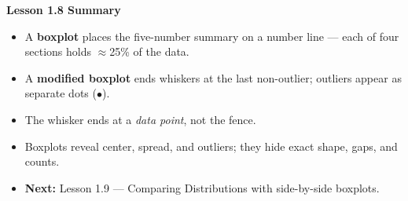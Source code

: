 \documentclass[aspectratio=169, 11pt]{beamer}
\begin{document}
{
\begin{frame}[plain]
  \vspace{1.5cm}
  \hspace{0.55cm}%
  \begin{minipage}{0.9\textwidth}
    {\color{goldacc}\bfseries\large Lesson 1.8 Summary}\\[0.8cm]
    \small
    \begin{itemize}\setlength{\itemsep}{0.5em}
      \item {\color{white} A \textbf{boxplot} places the five-number summary on a number
            line --- each of four sections holds $\approx$25\% of the data.}
      \item {\color{white} A \textbf{modified boxplot} ends whiskers at the last
            non-outlier; outliers appear as separate dots ($\bullet$).}
      \item {\color{white} The whisker ends at a \textit{data point}, not the fence.}
      \item {\color{white} Boxplots reveal center, spread, and outliers; they hide
            exact shape, gaps, and counts.}
      \item {\color{skymid} \textbf{Next:} Lesson 1.9 --- Comparing Distributions with
            side-by-side boxplots.}
    \end{itemize}
  \end{minipage}
\end{frame}
}
\end{document}
